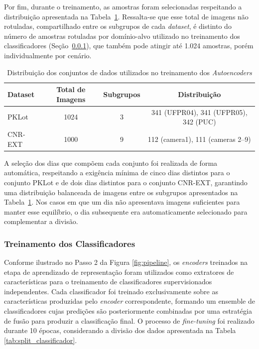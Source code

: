 \documentclass{article}
\begin{document}
Por fim, durante o treinamento, as amostras foram selecionadas respeitando a distribuição apresentada na Tabela~\ref{tab:datasets}. Ressalta-se que esse total de imagens não rotuladas, compartilhado entre os subgrupos de cada \textit{dataset}, é distinto do número de amostras rotuladas por domínio-alvo utilizado no treinamento dos classificadores (Seção~\ref{subsubsec:treino_classif}), que também pode atingir até 1.024 amostras, porém individualmente por cenário.

\begin{table}[!htbp]
\centering
\caption{Distribuição dos conjuntos de dados utilizados no treinamento dos \textit{Autoencoders}}
\label{tab:datasets}
\begin{tabular}{lccc}
\hline
\textbf{Dataset} & \textbf{Total de Imagens} & \textbf{Subgrupos} & \textbf{Distribuição} \\
\hline
PKLot & 1024 & 3 & 341 (UFPR04), 341 (UFPR05), 342 (PUC) \\
CNR-EXT & 1000 & 9 & 112 (camera1), 111 (cameras 2--9) \\
\hline
\end{tabular}
\end{table}

A seleção dos dias que compõem cada conjunto foi realizada de forma automática, respeitando a exigência mínima de cinco dias distintos para o conjunto PKLot e de dois dias distintos para o conjunto CNR-EXT, garantindo uma distribuição balanceada de imagens entre os subgrupos apresentados na Tabela~\ref{tab:datasets}. Nos casos em que um dia não apresentava imagens suficientes para manter esse equilíbrio, o dia subsequente era automaticamente selecionado para complementar a divisão.

\subsubsection{Treinamento dos Classificadores}\label{subsubsec:treino_classif}

Conforme ilustrado no Passo 2 da Figura \ref{fig:pipeline}, os \textit{encoders} treinados na etapa de aprendizado de representação foram utilizados como extratores de características para o treinamento de classificadores supervisionados independentes. Cada classificador foi treinado exclusivamente sobre as características produzidas pelo \textit{encoder} correspondente, formando um ensemble de classificadores cujas predições são posteriormente combinadas por uma estratégia de fusão para produzir a classificação final. O processo de \textit{fine-tuning} foi realizado durante 10 épocas, considerando a divisão dos dados apresentada na Tabela \ref{tab:split_classificador}.
\end{document}
